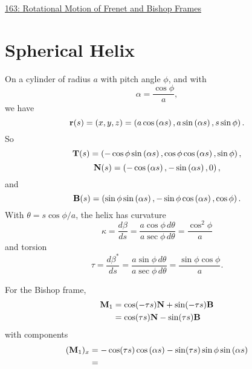 \documentclass{ximera}
\begin{document}
\begin{exploration}
\begin{onlineOnly}
    \begin{center}
\end{center}
\end{onlineOnly}

\href{https://www.desmos.com/3d/4cjlddpmwd}{163: Rotational Motion of Frenet and Bishop Frames}
\end{exploration}





\section*{Spherical Helix}
On a cylinder of radius $a$ with pitch angle $\phi$, and with 
\[
    \alpha = \frac{\cos\phi}{a},
\]
we have
\[
   {\bf r}(s) =  (x,y,z) = \left( a \cos \left( \alpha s \right) , a \sin \left( \alpha s \right), s \sin \phi  \right) .
\]
So
\[
     {\bf T}(s) = \left( - \cos\phi \sin \left( \alpha s \right)  ,\cos\phi   \cos \left( \alpha s \right)  , \sin \phi         \right) ,
\]
\[
         {\bf N}(s) = \left(  - \cos \left( \alpha s \right)  ,   -\sin \left( \alpha s \right) , 0    \right) ,
\]
and
\[
     {\bf B}(s) = \left(   \sin\phi  \sin \left( \alpha s \right) ,   -\sin\phi    \cos \left(\alpha s\right) , \cos\phi \right) .
\]
With $\theta = s\cos\phi/a$, the helix has curvature
\[
    \kappa = \frac{d\beta}{ds} = \frac{a\cos\phi \, d\theta}{a\sec\phi \, d\theta} = \frac{\cos^2\phi}{a}
\]
and torsion
\[
     \tau = \frac{d\beta^*}{ds} = \frac{a\sin\phi \, d\theta}{a\sec\phi \, d\theta} = \frac{\sin\phi\cos\phi}{a}.
\]

For the Bishop frame,
\begin{align*}
{\bf M}_1 &= \cos(-\tau s) {\bf N} + \sin(-\tau s) {\bf B}     \\
               &= \cos(\tau s) {\bf N} - \sin(\tau s) {\bf B} \\
\end{align*}
with components
\begin{align*}
     ( {\bf M}_1)_x &= - \cos(\tau s)\cos \left( \alpha s \right) - \sin(\tau s)   \sin\phi  \sin \left( \alpha s \right) \\
                           &= 
\end{align*}
\end{document}
